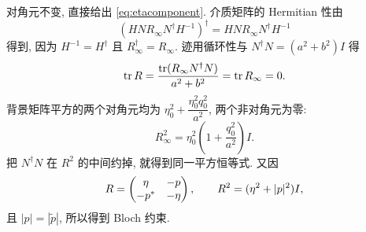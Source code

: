 对角元不变, 直接给出 \eqref{eq:etacomponent}.
介质矩阵的 Hermitian 性由
\begin{equation*}
(HN R_\infty N^\dagger H^{-1})^\dagger
=HN R_\infty N^\dagger H^{-1}
\end{equation*}
得到, 因为 $H^{-1}=H^\dagger$ 且 $R_\infty^\dagger=R_\infty$.
迹用循环性与 $N^\dagger N=(a^2+b^2)I$ 得
\begin{equation*}
\operatorname{tr} R
=\dfrac{\operatorname{tr}(R_\infty N^\dagger N)}{a^2+b^2}
=\operatorname{tr} R_\infty=0.
\end{equation*}
背景矩阵平方的两个对角元均为
$\eta_0^2+\dfrac{\eta_0^2q_0^2}{a^2}$, 两个非对角元为零:
\begin{equation*}
R_\infty^2
=\eta_0^2\left(1+\dfrac{q_0^2}{a^2}\right)I.
\end{equation*}
把 $N^\dagger N$ 在 $R^2$ 的中间约掉, 就得到同一平方恒等式.
又因
\begin{equation*}
R=\begin{pmatrix}\eta&-p\\-{p}^{*}&-\eta\end{pmatrix},\qquad
R^2=(\eta^2+|p|^2)I,
\end{equation*}
且 $|p|=|\widetilde p|$, 所以得到 Bloch 约束.

